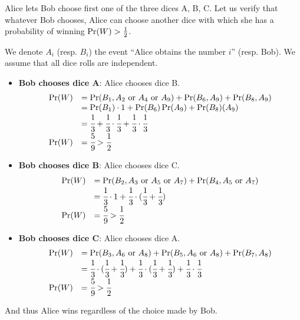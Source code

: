 \providecommand{\f}[2]{\ensuremath{\cfrac{#1}{#2}}}

Alice lets Bob choose first one of the three dices A, B, C. Let us verify that whatever Bob chooses, Alice can choose another dice with which she has a probability of winning $\Pr(W) > {1 \over 2}$.

We denote $A_i$ (resp. $B_i$) the event ``Alice obtains the number $i$'' (resp. Bob). We assume that all dice rolls are independent.

\begin{itemize}
  \item \textbf{Bob chooses dice A}: Alice chooses dice B.\\
  \[
    \begin{array}{ll}
      \Pr(W) & = \Pr(B_1, {A_2\text{ or }A_4\text{ or }A_9}) + \Pr(B_6, A_9) + \Pr(B_8, A_9) \\
             & = \Pr(B_1) \cdot 1 + \Pr(B_6)\Pr(A_9) + \Pr(B_8)(A_9) \\
             & = \f{1}{3} + \f{1}{3} \cdot \f{1}{3} + \f{1}{3} \cdot \f{1}{3} \\
      \Pr(W) & = \f{5}{9} > \f{1}{2}
    \end{array}
  \]

  \item \textbf{Bob chooses dice B}: Alice chooses dice C.\\
  \[
    \begin{array}{ll}
      \Pr(W) & = \Pr(B_2, {A_3\text{ or }A_5\text{ or }A_7}) + \Pr(B_4, {A_5\text{ or }A_7}) \\
             & = \f{1}{3} \cdot 1 + \f{1}{3} \cdot (\f{1}{3} + \f{1}{3}) \\
      \Pr(W) & = \f{5}{9} > \f{1}{2}
    \end{array}
  \]

  \item \textbf{Bob chooses dice C}: Alice chooses dice A.\\
  \[
    \begin{array}{ll}
      \Pr(W) & = \Pr(B_3, {A_6\text{ or }A_8}) + \Pr(B_5, {A_6\text{ or }A_8}) + \Pr(B_7, A_8) \\
             & = \f{1}{3} \cdot (\f{1}{3} + \f{1}{3}) + \f{1}{3} \cdot (\f{1}{3} + \f{1}{3}) + \f{1}{3} \cdot \f{1}{3} \\
      \Pr(W) & = \f{5}{9} > \f{1}{2}
    \end{array}
  \]
\end{itemize}

And thus Alice wins regardless of the choice made by Bob.
